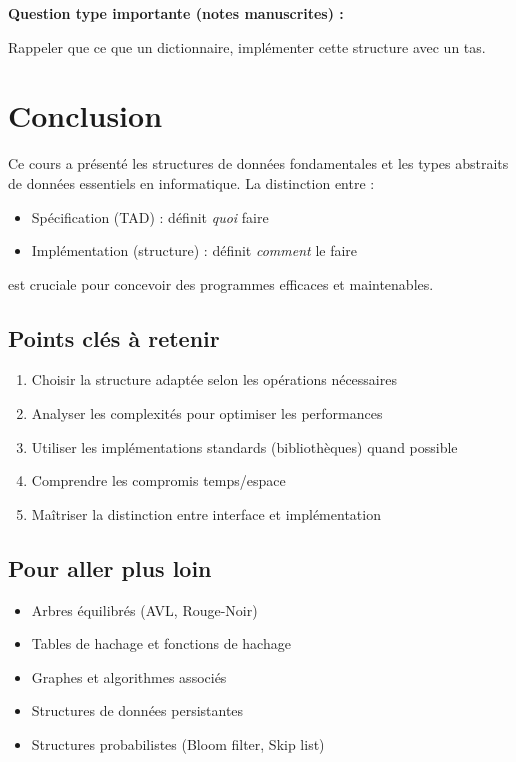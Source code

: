 \documentclass[12pt,a4paper]{article}
\begin{document}
\begin{notecours}
\textbf{Question type importante (notes manuscrites) :}

Rappeler que ce que un dictionnaire, implémenter cette structure avec un tas.
\end{notecours}

\newpage
\section{Conclusion}

\begin{important}
Ce cours a présenté les structures de données fondamentales et les types abstraits de données essentiels en informatique. La distinction entre :

\begin{itemize}
    \item \textcolor{algoviolet}{Spécification (TAD)} : définit \textit{quoi} faire
    \item \textcolor{defvert}{Implémentation (structure)} : définit \textit{comment} le faire
\end{itemize}

est cruciale pour concevoir des programmes efficaces et maintenables.
\end{important}

\subsection{Points clés à retenir}

\begin{enumerate}
    \item \textcolor{titrebleu}{Choisir} la structure adaptée selon les opérations nécessaires
    \item \textcolor{titrebleu}{Analyser} les complexités pour optimiser les performances
    \item \textcolor{titrebleu}{Utiliser} les implémentations standards (bibliothèques) quand possible
    \item \textcolor{titrebleu}{Comprendre} les compromis temps/espace
    \item \textcolor{titrebleu}{Maîtriser} la distinction entre interface et implémentation
\end{enumerate}

\subsection{Pour aller plus loin}

\begin{exemple}
\begin{itemize}
    \item Arbres équilibrés (AVL, Rouge-Noir)
    \item Tables de hachage et fonctions de hachage
    \item Graphes et algorithmes associés
    \item Structures de données persistantes
    \item Structures probabilistes (Bloom filter, Skip list)
\end{itemize}
\end{exemple}
\end{document}
